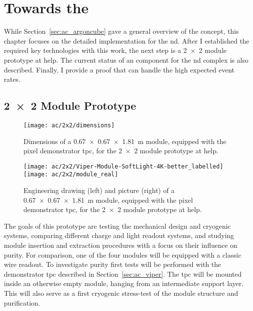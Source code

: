 \chapter{Towards the  }
\label{chap:dune-nd}

While Section~\ref{sec:ac_argoncube} gave a general overview of the \AC{} concept, this chapter focuses on the detailed implementation for the \dune{} \gls{nd}.
After I established the required key technologies with this work, the next step is a \num{2 x 2} module prototype at \gls{help}.
The current status of an \AC{} \lartpc{} component for the \dune{} \gls{nd} complex is also described.
Finally, I provide a proof that \AC{} can handle the high expected event rates.


\section{\num{2 x 2} Module \AC{} Prototype}
\label{sec:dune-nd_ac-2x2}

\begin{figure}[htb]
	\centering
	\texttt{[image: ac/2x2/dimensions]}
	\caption[\AC{} \num{2 x 2} prototype module dimensions]{%
		Dimensions of a \SI{0.67 x 0.67 x 1.81}{\metre} module, equipped with the pixel demonstrator \acrshort{tpc}, for the \num{2 x 2} module \AC{} prototype at \acrshort{help}.
	}
	\label{fig:2x2_dim}
\end{figure}

\begin{figure}[htb]
	\centering
	\texttt{[image: ac/2x2/Viper-Module-SoftLight-4K-better\_labelled]}
	\texttt{[image: ac/2x2/module\_real]}
	\caption[\AC{} \num{2 x 2} prototype module]{%
		Engineering drawing (left) and picture (right) of a \SI{0.67 x 0.67 x 1.81}{\metre} module, equipped with the pixel demonstrator \acrshort{tpc}, for the \num{2 x 2} module \AC{} prototype at \acrshort{help}.
	}
	\label{fig:2x2_mod}
\end{figure}

The goals of this prototype are testing the mechanical design and cryogenic systems, comparing different charge and light readout systems, and studying module insertion and extraction procedures with a focus on their influence on purity.
For comparison, one of the four modules will be equipped with a classic wire readout.
To investigate purity first tests will be performed with the \AC{} demonstrator \gls{tpc} described in Section~\ref{sec:ac_viper}.
The \gls{tpc} will be mounted inside an otherwise empty module, hanging from an intermediate support layer.
This will also serve as a first cryogenic stress-test of the module structure and \lar{} purification.

